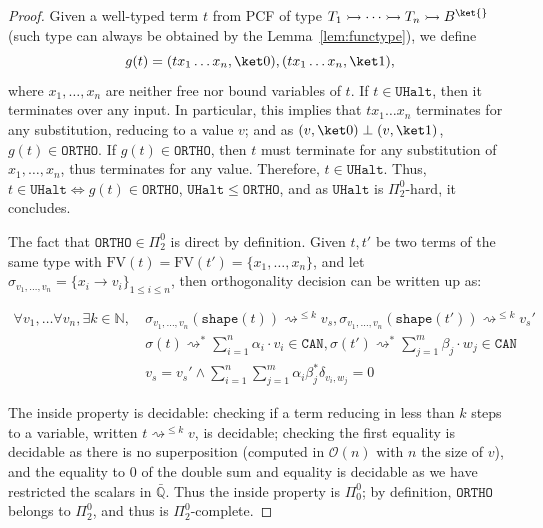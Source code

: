 \documentclass[10pt,a4paper]{article}
\newcommand{\tvar}{T}
\newcommand{\bvar}{B}
\newcommand\bkvar{\bvar^{\ket{}}}
\newcommand{\anyfunc}{\rightarrowtail}
\newcommand{\zket}{\ket 0}
\newcommand{\oket}{\ket 1}
\newcommand{\shape}[1]{\mathtt{shape}(#1)}
\newcommand{\can}{\ensuremath{\mathtt{CAN}}}
\newcommand{\fv}[1]{\mathrm{FV}(#1)}
\newcommand{\pitwo}{\Pi_2^0}
\newcommand{\portho}{\mathtt{ORTHO}}
\newcommand{\uhalt}{\mathtt{UHalt}}
\newcommand\kron[2]{\delta_{#1, #2}}
\newcommand{\subarrow}{\to}
\newcommand{\reduces}{\rightsquigarrow}
\newcommand{\sreduces}{\reduces^*}
\newcommand{\mostreduces}[1]{\ensuremath{\reduces^{\leq #1}}}
\newcommand{\mcal}{\mathcal}
\begin{document}
\begin{proof}
  Given a well-typed term $t$ from PCF of type $\tvar_1 \anyfunc
  \dots \anyfunc \tvar_n \anyfunc \bkvar$
  (such type can always be obtained by the Lemma~\ref{lem:functype}),
  we define
  \[
    g(t) = (tx_1\dots x_n, \zket), (tx_1\dots x_n, \oket),
  \]
  where $x_1, \dots, x_n$ are neither free nor bound variables of $t$.
  If $t \in \uhalt$, then it terminates over any input.
  In particular, this implies that $tx_1 \dots x_n$ terminates for
  any substitution, reducing to a value $v$;
  and as $(v, \zket) \perp (v, \oket)$, $g(t) \in \portho$.
  If $g(t) \in \portho$, then $t$ must terminate for any substitution
  of $x_1, \dots, x_n$, thus terminates for any value.
  Therefore, $t \in \uhalt$.
  Thus, $t \in \uhalt \iff g(t) \in \portho$, $\uhalt \leq
  \portho$, and as $\uhalt$ is $\pitwo$-hard, it concludes.

  The fact that $\portho \in \pitwo$ is direct by definition.
  Given $t, t'$ be two terms of the same type with $\fv t = \fv{t'} =
  \{x_1, \dots, x_n\}$, and let $\sigma_{v_1, \dots, v_n} = \{x_i
  \subarrow v_i\}_{1 \leq i \leq n}$, then orthogonality decision can
  be written up as:

  \[
    \begin{aligned}
      \forall v_1, \dots \forall v_n, \exists k \in \mathbb
      N,\ &\sigma_{v_1, \dots, v_n}(\shape t) \mostreduces{k} v_s,
      \sigma_{v_1, \dots, v_n}(\shape{t'}) \reduces^{\leq k} v_s'  \\
      &\sigma(t) \sreduces \sum_{i=1}^n \alpha_i \cdot v_i \in
      \can, \sigma(t') \sreduces \sum_{j=1}^m \beta_j \cdot w_j
      \in \can \\
      & v_s = v_s' \wedge \sum_{i=1}^n \sum_{j=1}^m \alpha_i
      \beta_j^* \kron{v_i}{w_j} = 0
    \end{aligned}
  \]

  The inside property is decidable: checking if a term reducing in
  less than $k$ steps to a variable, written $t \mostreduces{k} v$,
  is decidable; checking the first equality is decidable as there is
  no superposition (computed in $\mcal O(n)$ with $n$ the size of
  $v$), and the equality to $0$ of the double sum and equality is
  decidable as we have restricted the scalars in $\bar{\mathbb Q}$.
  Thus the inside property is $\Pi_0^0$; by definition, $\portho$
  belongs to $\pitwo$, and thus is $\pitwo$-complete. \qedhere

\end{proof}


\ortholower*
\end{document}
